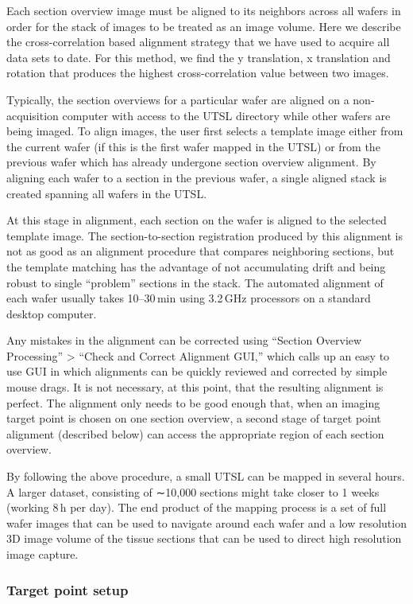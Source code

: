 \documentclass{article}
\begin{document}
Each section overview image must be aligned to its neighbors across all wafers in order for the stack of images to be treated as an image volume. Here we describe the cross-correlation based alignment strategy that we have used to acquire all data sets to date. For this method, we find the y translation, x translation and rotation that produces the highest cross-correlation value between two images.

Typically, the section overviews for a particular wafer are aligned on a non-acquisition computer with access to the UTSL directory while other wafers are being imaged. To align images, the user first selects a template image either from the current wafer (if this is the first wafer mapped in the UTSL) or from the previous wafer which has already undergone section overview alignment. By aligning each wafer to a section in the previous wafer, a single aligned stack is created spanning all wafers in the UTSL.

At this stage in alignment, each section on the wafer is aligned to the selected template image. The section-to-section registration produced by this alignment is not as good as an alignment procedure that compares neighboring sections, but the template matching has the advantage of not accumulating drift and being robust to single “problem” sections in the stack. The automated alignment of each wafer usually takes 10–30\,min using 3.2\,GHz processors on a standard desktop computer.

Any mistakes in the alignment can be corrected using “Section Overview Processing” > “Check and Correct Alignment GUI,” which calls up an easy to use GUI in which alignments can be quickly reviewed and corrected by simple mouse drags. It is not necessary, at this point, that the resulting alignment is perfect. The alignment only needs to be good enough that, when an imaging target point is chosen on one section overview, a second stage of target point alignment (described below) can access the appropriate region of each section overview.

By following the above procedure, a small UTSL can be mapped in several hours. A larger dataset, consisting of ∼10,000 sections might take closer to 1 weeks (working 8\,h per day). The end product of the mapping process is a set of full wafer images that can be used to navigate around each wafer and a low resolution 3D image volume of the tissue sections that can be used to direct high resolution image capture.

\subsubsection*{Target point setup}
\end{document}
